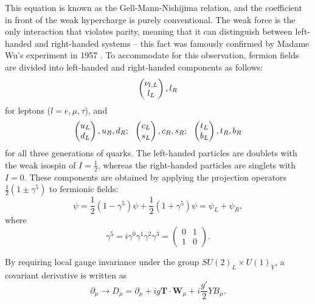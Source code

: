 This equation is known as the Gell-Mann-Nishijima relation, and the coefficient in front of the weak hypercharge is
purely conventional. The weak force is the only interaction that violates parity, meaning that it can distinguish
between left-handed and right-handed systems -- this fact was famously confirmed by Madame Wu's experiment in 1957
\autocite{Madame_Wu}. To accommodate for this observation, fermion fields are divided into left-handed and right-handed
components as follows:
\begin{equation}
\begin{pmatrix} \nu_{l,L} \\ l_L \end{pmatrix}, l_R
\label{eq:lepton_EWK_fields}
\end{equation} 
for leptons ($l = e, \mu, \tau$), and
\begin{equation}
\begin{pmatrix} u_L \\ d_L \end{pmatrix}, u_R, d_R; ~~ \begin{pmatrix} c_L \\ s_L \end{pmatrix}, c_R, s_R; ~~ \begin{pmatrix} t_L \\ b_L \end{pmatrix}, t_R, b_R
\label{eq:quark_EWK_fields}
\end{equation} 
for all three generations of quarks. The left-handed particles are doublets with the weak isospin of $I = \frac{1}{2}$,
whereas the right-handed particles are singlets with $I = 0$. These components are obtained by applying the projection
operators $\frac{1}{2}(1\pm\gamma^5)$ to fermionic fields:
\begin{equation}
\psi = \frac{1}{2}(1-\gamma^5) \psi + \frac{1}{2}(1 + \gamma^5)\psi = \psi_L +  \psi_R,
\end{equation} 
where
\begin{equation}
\gamma^5 = i \gamma^0  \gamma^1  \gamma^2  \gamma^3 = \begin{pmatrix}
0 & 1\\
1 & 0
\end{pmatrix}.
\end{equation}

By requiring local gauge invariance under the group $SU(2)_L \times U(1)_Y$, a covariant derivative is written as
\begin{equation}
\partial_\mu \rightarrow D_\mu = \partial_\mu + i g \mathbf{T} \cdot \mathbf{W}_\mu + i \frac{g'}{2} Y B_\mu.
\label{eq:D_mu_EWK}
\end{equation}

